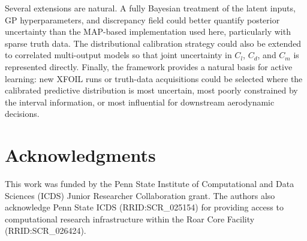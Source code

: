 \documentclass[a4paper,12pt]{article}
\begin{document}
Several extensions are natural. A fully Bayesian treatment of the latent inputs, GP hyperparameters, and discrepancy field could better quantify posterior uncertainty than the MAP-based implementation used here, particularly with sparse truth data. The distributional calibration strategy could also be extended to correlated multi-output models so that joint uncertainty in $C_l$, $C_d$, and $C_m$ is represented directly. Finally, the framework provides a natural basis for active learning: new XFOIL runs or truth-data acquisitions could be selected where the calibrated predictive distribution is most uncertain, most poorly constrained by the interval information, or most influential for downstream aerodynamic decisions.


\section*{Acknowledgments}
This work was funded by the Penn State Institute of Computational and Data Sciences (ICDS) Junior Researcher Collaboration grant. The authors also acknowledge Penn State ICDS (RRID:SCR\_025154) for providing access to computational research infrastructure within the Roar Core Facility (RRID:SCR\_026424).
\end{document}
